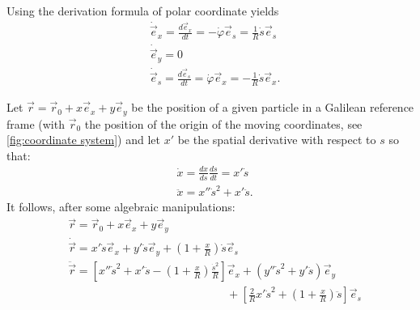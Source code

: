 Using the derivation formula of polar coordinate yields
\begin{align}
&\dot{\vec{e}}_x = \frac{d\vec{e}_x}{d t} = -\dot{\varphi} \vec{e}_s = \frac{1}{R} \dot{s}\vec{e}_s \nonumber \\
&\dot{\vec{e}}_y = 0 \\
&\dot{\vec{e}}_s = \frac{d\vec{e}_s}{d t} = \dot{\varphi} \vec{e}_x = -\frac{1}{R} \dot{s}\vec{e}_x \nonumber.
\end{align}

Let $\vec{r} = \vec{r}_0 + x\vec{e}_x + y \vec{e}_y$ be the position of a given particle in a Galilean reference frame (with $\vec{r}_0$ the position of the origin of the moving coordinates, see \cref{fig:coordinate system}) and let $x'$ be the spatial derivative with respect to $s$ so that:
\begin{equation}
\begin{aligned}
&\dot{x}= \frac{dx}{ds}\frac{ds}{dt} = x'\dot{s}  \\
&\ddot{x}= x''\dot{s}^2+x'\ddot{s}.
\end{aligned}
\end{equation}
It follows, after some algebraic manipulations:
\begin{align}
\label{eq:kinematics}
&\vec{r} = \vec{r}_0 + x\vec{e}_x + y \vec{e}_y \nonumber \\
&\dot{\vec{r}}= x' \dot{s} \vec{e}_x + y'\dot{s} \vec{e}_y  + \left(1+\frac{x}{R}\right)\dot{s}\vec{e}_s\\
&\ddot{\vec{r}}= \left[x'' \dot{s}^2 + x' \ddot{s} - \left( 1+\frac{x}{R} \right)\frac{\dot{s}^2}{R}\right] \vec{e}_x + (y''\dot{s}^2 + y'\ddot{s}) \vec{e}_y \nonumber \\
& \hspace{14em} + \left[\frac{2}{R}x'\dot{s}^2 +\left(1+\frac{x}{R}\right)\ddot{s}\right]\vec{e}_s \nonumber
\end{align}

